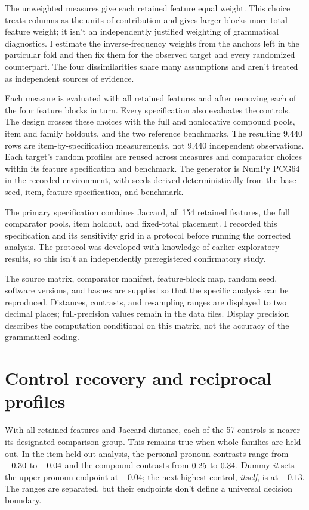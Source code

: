 \documentclass[12pt]{article}
\providecommand{\mention}[1]{\textit{#1}}
\begin{document}
The unweighted measures give each retained feature equal weight. This choice treats columns as the units of contribution and gives larger blocks more total feature weight; it isn't an independently justified weighting of grammatical diagnostics. I estimate the inverse-frequency weights from the anchors left in the particular fold and then fix them for the observed target and every randomized counterpart. The four dissimilarities share many assumptions and aren't treated as independent sources of evidence.

Each measure is evaluated with all retained features and after removing each of the four feature blocks in turn. Every specification also evaluates the controls. The design crosses these choices with the full and nonlocative compound pools, item and family holdouts, and the two reference benchmarks. The resulting 9,440 rows are item-by-specification measurements, not 9,440 independent observations. Each target's random profiles are reused across measures and comparator choices within its feature specification and benchmark. The generator is NumPy PCG64 in the recorded environment, with seeds derived deterministically from the base seed, item, feature specification, and benchmark.

The primary specification combines Jaccard, all 154 retained features, the full comparator pools, item holdout, and fixed-total placement. I recorded this specification and its sensitivity grid in a protocol before running the corrected analysis. The protocol was developed with knowledge of earlier exploratory results, so this isn't an independently preregistered confirmatory study.

The source matrix, comparator manifest, feature-block map, random seed, software versions, and hashes are supplied so that the specific analysis can be reproduced. Distances, contrasts, and resampling ranges are displayed to two decimal places; full-precision values remain in the data files. Display precision describes the computation conditional on this matrix, not the accuracy of the grammatical coding.

\section{Control recovery and reciprocal profiles}
\label{sec:results}

With all retained features and Jaccard distance, each of the 57 controls is nearer its designated comparison group. This remains true when whole families are held out. In the item-held-out analysis, the personal-pronoun contrasts range from $-0.30$ to $-0.04$ and the compound contrasts from $0.25$ to $0.34$. Dummy \mention{it} sets the upper pronoun endpoint at $-0.04$; the next-highest control, \mention{itself}, is at $-0.13$. The ranges are separated, but their endpoints don't define a universal decision boundary.
\end{document}
